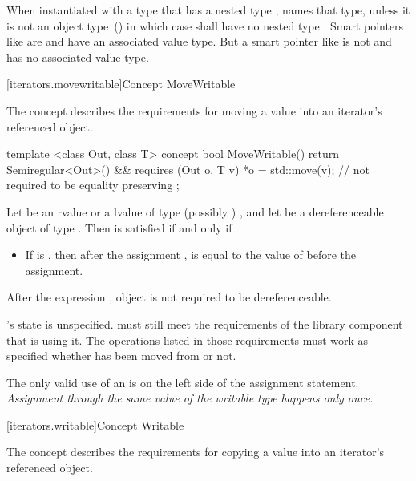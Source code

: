 \begin{addedblock}
\pnum
When instantiated with a type  that has a nested type ,
 names that type, unless it is not an object type~() in which case
 shall have no nested type . \enternote Smart pointers like
 are  and have an associated value type. But a smart pointer
like  is not  and has no associated value type.\exitnote

[iterators.movewritable]{Concept MoveWritable}

\pnum
The  concept describes the requirements for moving a value into an iterator's
referenced object.

%
\begin{codeblock}
  template <class Out, class T>
  concept bool MoveWritable() {
    return Semiregular<Out>() &&
      requires (Out o, T v) {
        *o = std::move(v); // not required to be equality preserving
      };
  }
\end{codeblock}

\pnum
Let  be an rvalue or a lvalue of type (possibly ) , and let 
be a dereferenceable object of type . Then  is satisfied if and only if

\begin{itemize}
\item If  is ,
then after the assignment ,  is equal
to the value of  before the assignment.
\end{itemize}

\pnum
After the expression , object  is not required to be dereferenceable.

\pnum
{}'s state is unspecified. \enternote {} must still meet the
requirements of the library component that is using it. The operations listed
in those requirements must work as specified whether  has been moved
from or not.\exitnote

\pnum
\enternote
The only valid use of an  is on the left side of the assignment statement.
\textit{Assignment through the same value of the writable type happens only once.}
\exitnote

[iterators.writable]{Concept Writable}

\pnum
The  concept describes the requirements for copying a value into an iterator's
referenced object.


\end{addedblock}
